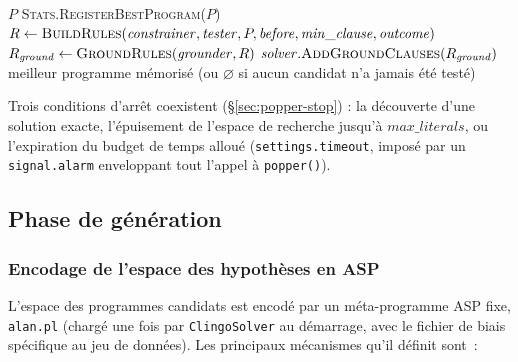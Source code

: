 \begin{algorithm}[H]
\begin{algorithmic}[1]
             
                \State \Return $P$ 
            \EndIf
            \State \textsc{Stats}.\textsc{RegisterBestProgram}($P$)
        \EndIf
        \State {}
        \State $R \gets \textsc{BuildRules}(\mathit{constrainer}, \mathit{tester}, P, \mathit{before}, \mathit{min\_clause}, \mathit{outcome})$
        \State $R_{\mathit{ground}} \gets \textsc{GroundRules}(\mathit{grounder}, R)$
        \State $\mathit{solver}.\textsc{AddGroundClauses}(R_{\mathit{ground}})$
    \EndWhile
\EndFor
\State \Return meilleur programme mémorisé (ou $\varnothing$ si aucun candidat n'a jamais été testé)
\end{algorithmic}
\end{algorithm}

Trois conditions d'arrêt coexistent (\S\ref{sec:popper-stop}) : la
découverte d'une solution exacte, l'épuisement de l'espace de recherche
jusqu'à $\mathit{max\_literals}$, ou l'expiration du budget de temps
alloué (\texttt{settings.timeout}, imposé par un \texttt{signal.alarm}
enveloppant tout l'appel à \texttt{popper()}).

\subsection{Phase de génération}
\label{sec:popper-generate}

\subsubsection{Encodage de l'espace des hypothèses en ASP}

L'espace des programmes candidats est encodé par un méta-programme ASP
fixe, \texttt{alan.pl} (chargé une fois par \texttt{ClingoSolver} au
démarrage, avec le fichier de biais spécifique au jeu de données). Les
principaux mécanismes qu'il définit sont~:

